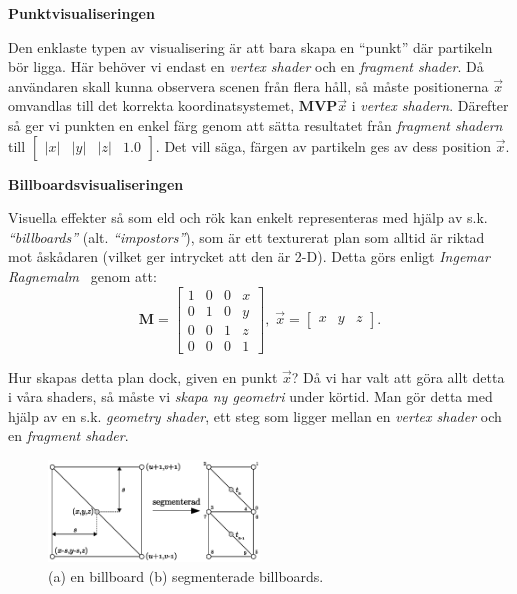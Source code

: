 \documentclass[a4paper]{article}
\begin{document}
\begin{multicols}{2}
\textbf{Punktvisualiseringen}

Den enklaste typen av visualisering är att bara skapa en ``punkt'' där partikeln bör ligga. Här behöver vi endast en \emph{vertex shader} och en \emph{fragment shader}. Då användaren skall kunna observera scenen från flera håll, så måste positionerna \(\vec{x}\) omvandlas till det korrekta koordinatsystemet, \(\mathbf{MVP}\vec{x}\) i \emph{vertex shadern}. Därefter så ger vi punkten en enkel färg genom att sätta resultatet från \emph{fragment shadern} till \(\begin{bmatrix}|x| & |y| & |z| & 1.0\end{bmatrix}\). Det vill säga, färgen av partikeln ges av dess position \(\vec{x}\).

\textbf{Billboardsvisualiseringen}

Visuella effekter så som eld och rök kan enkelt representeras med hjälp av s.k. \emph{``billboards''} (alt. \emph{``impostors''}), som är ett texturerat plan som alltid är riktad mot åskådaren (vilket ger intrycket att den är 2-D). Detta görs enligt \emph{Ingemar Ragnemalm}~\cite{ragnemalm2008polygons} genom att: \[\mathbf{M} = \begin{bmatrix} 1 & 0 & 0 & x \\
                                    0 & 1 & 0 & y \\
                                    0 & 0 & 1 & z \\
                                    0 & 0 & 0 & 1 \end{bmatrix}, \;
          \vec{x} = \begin{bmatrix}x & y & z\end{bmatrix}.\]

Hur skapas detta plan dock, given en punkt \(\vec{x}\)? Då vi har valt att göra allt detta i våra shaders, så måste vi \emph{skapa ny geometri} under körtid. Man gör detta med hjälp av en s.k. \emph{geometry shader}, ett steg som ligger mellan en \emph{vertex shader} och en \emph{fragment shader}.

\begin{figure}[H]
\center
\includegraphics[width=0.5\textwidth]{share/Billboards.eps}
\caption{(a) en billboard (b) segmenterade billboards.}
\label{fig:bill}
\end{figure}


\end{multicols}
\end{document}
